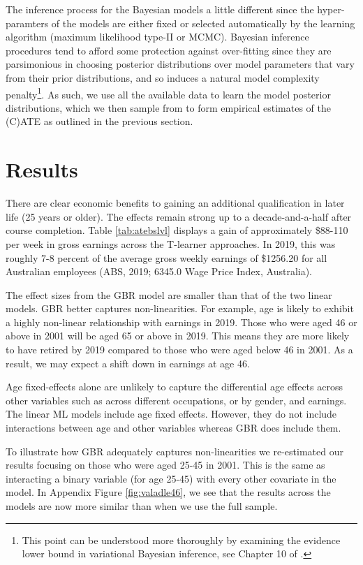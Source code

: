 \documentclass[12pt, a4paper]{article}
\begin{document}
The inference process for the Bayesian models a little different since the
hyper-paramters of the models are either fixed or selected automatically by the
learning algorithm (maximum likelihood type-II or MCMC). Bayesian inference
procedures tend to afford some protection against over-fitting since they are
parsimonious in choosing posterior distributions over model parameters that
vary from their prior distributions, and so induces a natural model complexity
penalty\footnote{This point can be understood more thoroughly by examining the
evidence lower bound in variational Bayesian inference, see Chapter 10 of
\citet{bishop2006}.}. As such, we use all the available data to learn the model
posterior distributions, which we then sample from to form empirical estimates
of the (C)ATE as outlined in the previous section. 


\section{Results}

There are clear economic benefits to gaining an additional qualification in later life (25 years or older). The effects remain strong up to a decade-and-a-half after course completion. Table \ref{tab:atebslvl} displays a gain of approximately \$88-110 per week in gross earnings across the T-learner approaches. In 2019, this was roughly 7-8 percent of the average gross weekly earnings of \$1256.20 for all Australian employees (ABS, 2019; 6345.0 Wage Price Index, Australia). 

The effect sizes from the GBR model are smaller than that of the two linear models. GBR better captures non-linearities. For example, age is likely to exhibit a highly non-linear relationship with earnings in 2019. Those who were aged 46 or above in 2001 will be aged 65 or above in 2019. This means they are more likely to have retired by 2019 compared to those who were aged below 46 in 2001. As a result, we may expect a shift down in earnings at age 46. 

Age fixed-effects alone are unlikely to capture the differential age effects across other variables such as across different occupations, or by gender, and earnings. The linear ML models include age fixed effects. However, they do not include interactions between age and  other variables whereas GBR does include them.

To illustrate how GBR adequately captures non-linearities we re-estimated our results focusing on those who were aged 25-45 in 2001. This is the same as interacting a binary variable (for age 25-45) with every other covariate in the model. In Appendix Figure \ref{fig:valadle46}, we see that the results across the models are now more similar than when we use the full sample.
\end{document}
